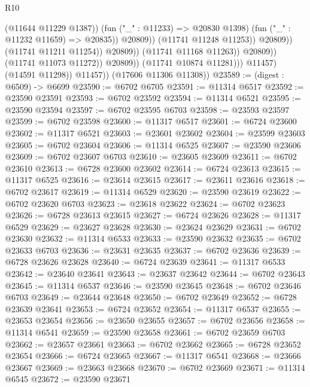 \begin{lexlean}{R10}
\begin{coremodule}
                                                  (@11644 @11229 @1387))
                                                (fun ("_" : @11233) => @20830 @1398)
                                                (fun ("_" : @11232 @11659) => @20835))
                                              @20809))
                                          (@11741 @11248 @11253))
                                        @20809))
                                    (@11741 @11211 @11254))
                                  @20809))
                              (@11741 @11168 @11263))
                            @20809))
                        (@11741 @11073 @11272))
                      @20809))
                  (@11741 @10874 @11281)))
              @11457)
            (@14591 @11298))
          @11457))
      (@17606 @11306 @11308))
@23589 := (digest : @6509) -> @6699
@23590 := @6702 @6705
@23591 := @11314 @6517
@23592 := @23590 @23591
@23593 := @6702 @23592
@23594 := @11314 @6521
@23595 := @23590 @23594
@23597 := @6702 @23595 @6703
@23598 := @23593 @23597
@23599 := @6702 @23598
@23600 := @11317 @6517
@23601 := @6724 @23600
@23602 := @11317 @6521
@23603 := @23601 @23602
@23604 := @23599 @23603
@23605 := @6702 @23604
@23606 := @11314 @6525
@23607 := @23590 @23606
@23609 := @6702 @23607 @6703
@23610 := @23605 @23609
@23611 := @6702 @23610
@23613 := @6728 @23600 @23602
@23614 := @6724 @23613
@23615 := @11317 @6525
@23616 := @23614 @23615
@23617 := @23611 @23616
@23618 := @6702 @23617
@23619 := @11314 @6529
@23620 := @23590 @23619
@23622 := @6702 @23620 @6703
@23623 := @23618 @23622
@23624 := @6702 @23623
@23626 := @6728 @23613 @23615
@23627 := @6724 @23626
@23628 := @11317 @6529
@23629 := @23627 @23628
@23630 := @23624 @23629
@23631 := @6702 @23630
@23632 := @11314 @6533
@23633 := @23590 @23632
@23635 := @6702 @23633 @6703
@23636 := @23631 @23635
@23637 := @6702 @23636
@23639 := @6728 @23626 @23628
@23640 := @6724 @23639
@23641 := @11317 @6533
@23642 := @23640 @23641
@23643 := @23637 @23642
@23644 := @6702 @23643
@23645 := @11314 @6537
@23646 := @23590 @23645
@23648 := @6702 @23646 @6703
@23649 := @23644 @23648
@23650 := @6702 @23649
@23652 := @6728 @23639 @23641
@23653 := @6724 @23652
@23654 := @11317 @6537
@23655 := @23653 @23654
@23656 := @23650 @23655
@23657 := @6702 @23656
@23658 := @11314 @6541
@23659 := @23590 @23658
@23661 := @6702 @23659 @6703
@23662 := @23657 @23661
@23663 := @6702 @23662
@23665 := @6728 @23652 @23654
@23666 := @6724 @23665
@23667 := @11317 @6541
@23668 := @23666 @23667
@23669 := @23663 @23668
@23670 := @6702 @23669
@23671 := @11314 @6545
@23672 := @23590 @23671

\end{coremodule}
\end{lexlean}
